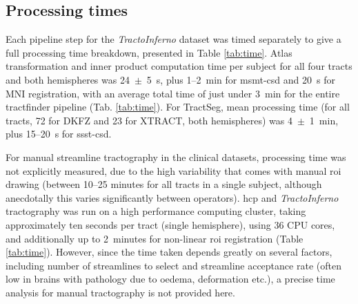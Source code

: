 
\subsection{Processing times}

Each pipeline step for the \textit{TractoInferno} dataset was timed separately to give a full processing time breakdown, presented in Table \ref{tab:time}.
Atlas transformation and inner product computation time per subject for all four tracts and both hemispheres was 24~$\pm$~5~s, plus 1--2~min for \gls{msmt}-\gls{csd} and 20~s for MNI registration, with an average total time of just under 3~min for the entire tractfinder pipeline (Tab. \ref{tab:time}).
For TractSeg, mean processing time (for all tracts, 72 for DKFZ and 23 for XTRACT, both hemispheres) was 4~$\pm$~1~min, plus 15--20~s for \gls{ssst}-\gls{csd}.

For manual streamline tractography in the clinical datasets, processing time was not explicitly measured, due to the high variability that comes with manual \gls{roi} drawing (between 10--25 minutes for all tracts in a single subject, although anecdotally this varies significantly between operators).
\Gls{hcp} and \textit{TractoInferno} tractography was run on a high performance computing cluster, taking approximately ten seconds per tract (single hemisphere), using 36 CPU cores, and additionally up to 2~minutes for non-linear \gls{roi} registration (Table \ref{tab:time}).
However, since the time taken depends greatly on several factors, including number of streamlines to select and streamline acceptance rate (often low in brains with pathology due to oedema, deformation etc.), a precise time analysis for manual tractography is not provided here.

